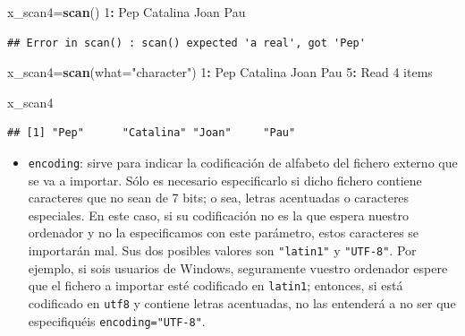 \documentclass[]{book}
\newenvironment{Shaded}{\begin{snugshade}}{\end{snugshade}}
\newcommand{\DataTypeTok}[1]{\textcolor[rgb]{0.13,0.29,0.53}{#1}}
\newcommand{\DecValTok}[1]{\textcolor[rgb]{0.00,0.00,0.81}{#1}}
\newcommand{\KeywordTok}[1]{\textcolor[rgb]{0.13,0.29,0.53}{\textbf{#1}}}
\newcommand{\NormalTok}[1]{#1}
\newcommand{\OperatorTok}[1]{\textcolor[rgb]{0.81,0.36,0.00}{\textbf{#1}}}
\newcommand{\StringTok}[1]{\textcolor[rgb]{0.31,0.60,0.02}{#1}}
\providecommand{\tightlist}{%
  \setlength{\itemsep}{0pt}\setlength{\parskip}{0pt}}
\theoremstyle{definition}
\theoremstyle{definition}
\theoremstyle{definition}
\theoremstyle{remark}
\begin{document}
\begin{Shaded}
\begin{Highlighting}[]
\NormalTok{x_scan4=}\KeywordTok{scan}\NormalTok{()}
\DecValTok{1}\OperatorTok{:}\StringTok{  }\NormalTok{Pep Catalina Joan Pau}
\end{Highlighting}
\end{Shaded}

\begin{verbatim}
## Error in scan() : scan() expected 'a real', got 'Pep'
\end{verbatim}

\begin{Shaded}
\begin{Highlighting}[]
\NormalTok{x_scan4=}\KeywordTok{scan}\NormalTok{(}\DataTypeTok{what=}\StringTok{"character"}\NormalTok{)}
\DecValTok{1}\OperatorTok{:}\StringTok{ }\NormalTok{Pep Catalina Joan Pau}
\DecValTok{5}\OperatorTok{:}\StringTok{ }
\NormalTok{Read }\DecValTok{4}\NormalTok{ items}
\end{Highlighting}
\end{Shaded}

\begin{Shaded}
\begin{Highlighting}[]
\NormalTok{x_scan4}
\end{Highlighting}
\end{Shaded}

\begin{verbatim}
## [1] "Pep"      "Catalina" "Joan"     "Pau"
\end{verbatim}

\begin{itemize}
\tightlist
\item
  \texttt{encoding}: sirve para indicar la codificación de alfabeto del fichero externo que se va a importar. Sólo es necesario especificarlo si dicho fichero contiene caracteres que no sean de 7 bits; o sea, letras acentuadas o caracteres especiales. En este caso, si su codificación no es la que espera nuestro ordenador y no la especificamos con este parámetro, estos caracteres se importarán mal. Sus dos posibles valores son \texttt{"latin1"} y \texttt{"UTF-8"}. Por ejemplo, si sois usuarios de Windows, seguramente vuestro ordenador espere que el fichero a importar esté codificado en \texttt{latin1}; entonces, si está codificado en \texttt{utf8} y contiene letras acentuadas, no las entenderá a no ser que especifiquéis \texttt{encoding="UTF-8"}.
\end{itemize}
\end{document}
